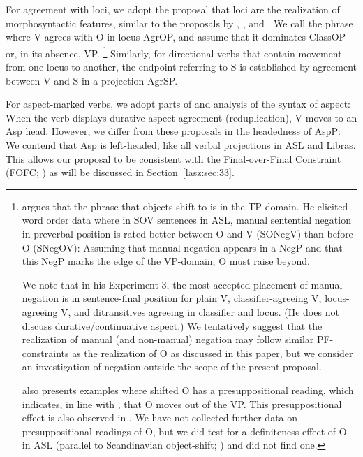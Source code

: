 \documentclass[output=paper]{langscibook}
\begin{document}
For agreement with loci, we adopt the proposal that loci are the
realization of morphosyntactic features, similar to the proposals by
\citet{Neidle.etal.2000}, \citet{Kuhn.2016}, and \citet{Pfau.etal.2018}. We call the
phrase where V agrees with O in locus AgrOP, and assume that it
dominates ClassOP or, in its absence, VP.%
\footnote{
    \citet{Gokgoz.2013} argues that the phrase that objects shift to is in the
    TP-domain. He elicited word order data where in SOV sentences in ASL, manual
    sentential negation in preverbal position is rated better between O and V (SONegV)
    than before O (SNegOV): Assuming that manual negation appears in a NegP and
    that this NegP marks the edge of the VP-domain, O must raise beyond.
    
    We note that in his Experiment 3, the most accepted placement of manual
    negation is in sentence-final position for plain V, classifier-agreeing V,
    locus-agreeing V, and ditransitives agreeing in classifier and locus. (He does not
    discuss durative/continuative aspect.) We tentatively suggest that the realization of
    manual (and non-manual) negation may follow similar PF-constraints as the
    realization of O as discussed in this paper, but we consider an investigation of
    negation outside the scope of the present proposal.
    
    \citeauthor{Gokgoz.2013} also presents examples where shifted O has a presuppositional
    reading, which indicates, in line with \citet{Diesing1992}, that O moves out of the VP.
    This presuppositional effect is also observed in \citet{Napoli.SS.RMQ.2017}. We have not
    collected further data on presuppositional readings of O, but we did test for a
    definiteness effect of O in ASL (parallel to Scandinavian object-shift; \citealp{Holmberg:1986})
    and did not find one.
}
Similarly, for
directional verbs that contain movement from one locus to another, the
endpoint referring to S is established by agreement between V and S
in a projection AgrSP.

For aspect-marked verbs, we adopt parts of 
and  analysis of the syntax of aspect: When the verb
displays durative-aspect agreement (reduplication), V moves to an Asp
head. However, we differ from these proposals in the headedness of
AspP: We contend that Asp is left-headed, like all verbal projections in
ASL and Libras. This allows our proposal to be consistent with the
Final-over-Final Constraint (FOFC; \citealp{BiberauerHR.2014,SheehanBRH.2017}) 
as will be discussed in Section~\ref{lasz:sec:33}.
\end{document}
